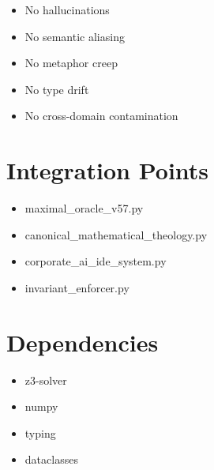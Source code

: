 ﻿\documentclass[12pt]{article}
\begin{document}
\begin{itemize}    \item No hallucinations
    \item No semantic aliasing
    \item No metaphor creep
    \item No type drift
    \item No cross-domain contamination
\end{itemize}

\section{Integration Points}

\begin{itemize}    \item maximal_oracle_v57.py
    \item canonical_mathematical_theology.py
    \item corporate_ai_ide_system.py
    \item invariant_enforcer.py
\end{itemize}

\section{Dependencies}

\begin{itemize}    \item z3-solver
    \item numpy
    \item typing
    \item dataclasses
\end{itemize}
\end{document}
